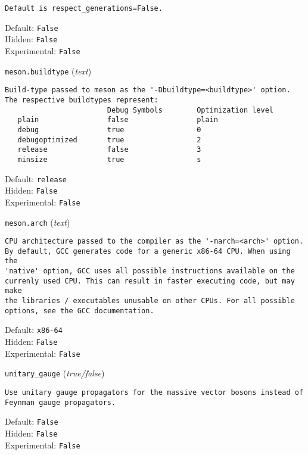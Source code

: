 \begin{basedescript}{\desclabelstyle{\pushlabel}}
\begin{verbatim}
Default is respect_generations=False.
\end{verbatim}
Default: \verb|False|
\\Hidden: \verb|False|
\\Experimental: \verb|False|
\\\item[\colorbox{gray!30}{\texttt{meson.buildtype}}] (\textit{text})
\begin{verbatim}
Build-type passed to meson as the '-Dbuildtype=<buildtype>' option.
The respective buildtypes represent:
                        Debug Symbols        Optimization level
   plain                false                plain
   debug                true                 0
   debugoptimized       true                 2
   release              false                3
   minsize              true                 s
\end{verbatim}
Default: \verb|release|
\\Hidden: \verb|False|
\\Experimental: \verb|False|
\\\item[\colorbox{gray!30}{\texttt{meson.arch}}] (\textit{text})
\begin{verbatim}
CPU architecture passed to the compiler as the '-march=<arch>' option.
By default, GCC generates code for a generic x86-64 CPU. When using the
'native' option, GCC uses all possible instructions available on the
currenly used CPU. This can result in faster executing code, but may make
the libraries / executables unusable on other CPUs. For all possible
options, see the GCC documentation.
\end{verbatim}
Default: \verb|x86-64|
\\Hidden: \verb|False|
\\Experimental: \verb|False|
\\\item[\colorbox{gray!30}{\texttt{unitary\_gauge}}] (\textit{true/false})
\begin{verbatim}
Use unitary gauge propagators for the massive vector bosons instead of
Feynman gauge propagators.
\end{verbatim}
Default: \verb|False|
\\Hidden: \verb|False|
\\Experimental: \verb|False|
\\\end{basedescript}
